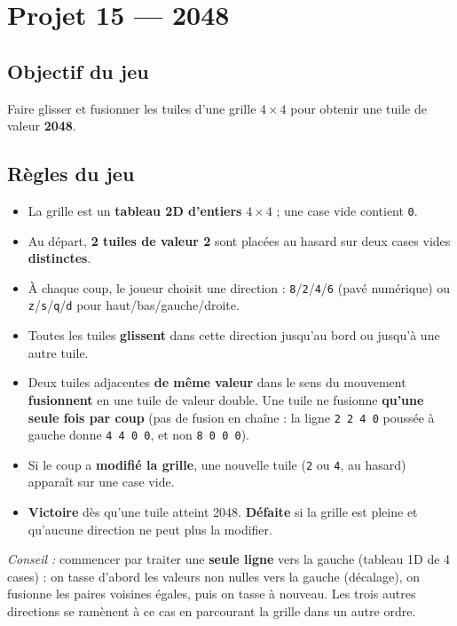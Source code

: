 \section{Projet 15 — 2048}
\setcounter{UPSTInumeroCahier des charges}{0}

\subsection*{Objectif du jeu}
Faire glisser et fusionner les tuiles d'une grille $4\times4$ pour obtenir une tuile de valeur \textbf{2048}.

\subsection*{Règles du jeu}
\begin{itemize}
  \item La grille est un \textbf{tableau 2D d'entiers} $4\times4$ ; une case vide contient \texttt{0}.
  \item Au départ, \textbf{2 tuiles de valeur 2} sont placées au hasard sur deux cases vides \textbf{distinctes}.
  \item À chaque coup, le joueur choisit une direction : \texttt{8}/\texttt{2}/\texttt{4}/\texttt{6} (pavé numérique) ou \texttt{z}/\texttt{s}/\texttt{q}/\texttt{d} pour haut/bas/gauche/droite.
  \item Toutes les tuiles \textbf{glissent} dans cette direction jusqu'au bord ou jusqu'à une autre tuile.
  \item Deux tuiles adjacentes \textbf{de même valeur} dans le sens du mouvement \textbf{fusionnent} en une tuile de valeur double. Une tuile ne fusionne \textbf{qu'une seule fois par coup} (pas de fusion en chaîne : la ligne \texttt{2 2 4 0} poussée à gauche donne \texttt{4 4 0 0}, et non \texttt{8 0 0 0}).
  \item Si le coup a \textbf{modifié la grille}, une nouvelle tuile (\texttt{2} ou \texttt{4}, au hasard) apparaît sur une case vide.
  \item \textbf{Victoire} dès qu'une tuile atteint 2048. \textbf{Défaite} si la grille est pleine et qu'aucune direction ne peut plus la modifier.
\end{itemize}

\textit{Conseil :} commencer par traiter une \textbf{seule ligne} vers la gauche (tableau 1D de 4 cases) : on tasse d'abord les valeurs non nulles vers la gauche (décalage), on fusionne les paires voisines égales, puis on tasse à nouveau. Les trois autres directions se ramènent à ce cas en parcourant la grille dans un autre ordre.

